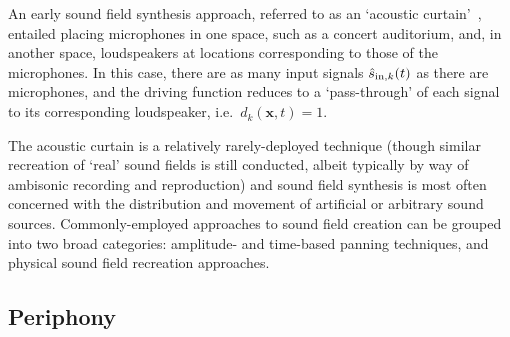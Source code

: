 
An early sound field synthesis approach, referred to as an `acoustic
curtain'~\citep{ziemer_wave_2020}, entailed placing microphones in one space,
such as a concert auditorium, and, in another space, loudspeakers at locations
corresponding to those of the microphones.
In this case, there are as many input signals $\hat{s}_{\text{in},k}(t)$ as there are
microphones, and the driving function reduces to a `pass-through' of each
signal to its corresponding loudspeaker, i.e.\
$d_k(\mathbf{x}, t) = 1$.

The acoustic curtain is a relatively rarely-deployed technique (though similar
recreation of `real' sound fields is still conducted, albeit typically by way
of ambisonic recording and reproduction) and sound field synthesis is most
often concerned with the distribution and movement of artificial or arbitrary
sound sources.
Commonly-employed approaches to sound field creation can be grouped into two
broad categories: amplitude- and time-based panning techniques, and physical
sound field recreation approaches.

\subsection{Periphony}\label{subsec:periphony}

